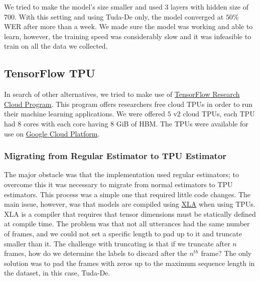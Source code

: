 We tried to make the model's size smaller and used $3$ layers with hidden size of $700$. With this setting and using Tuda-De only, the model converged at $50\%$ \ac{WER} after more than a week. We made sure the model was working and able to learn, however, the training speed was considerably slow and it was infeasible to train on all the data we collected.

\subsection{TensorFlow TPU}
\label{meth:s3_sub2}

In search of other alternatives, we tried to make use of \href{https://www.tensorflow.org/tfrc}{TensorFlow Research Cloud Program}. This program offers researchers free cloud \ac{TPU}s in order to run their machine learning applications. We were offered $5$ v2 cloud \ac{TPU}s, each \ac{TPU} had $8$ cores with each core having $8$ GiB of \ac{HBM}. The \ac{TPU}s were available for use on \href{https://cloud.google.com/}{Google Cloud Platform}. 

\subsubsection{Migrating from Regular Estimator to TPU Estimator}
\label{meth:s3_sub2_subsub1}

The major obstacle was that the implementation used regular estimators; to overcome this it was necessary to migrate from normal estimators to \ac{TPU} estimators. This process was a simple one that required little code changes. The main issue, however, was that models are compiled using \href{https://www.tensorflow.org/xla/}{\ac{XLA}} when using \ac{TPU}s. \ac{XLA} is a compiler that requires that tensor dimensions must be statically defined at compile time. The problem was that not all utterances had the same number of frames, and we could not set a specific length to pad up to it and truncate smaller than it. The challenge with truncating is that if we truncate after $n$ frames, how do we determine the labels to discard after the $n^{th}$ frame? The only solution was to pad the frames with zeros up to the maximum sequence length in the dataset, in this case, Tuda-De. 

